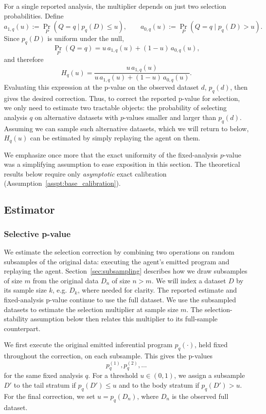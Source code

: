 \documentclass[10pt]{article}
\begin{document}
For a single reported analysis, the multiplier depends on just
two selection probabilities. Define
\[
a_{1,q}(u)
:=
\Pr_P\!\left(Q=q\mid p_q(D)\leq u\right),
\qquad
a_{0,q}(u)
:=
\Pr_P\!\left(Q=q\mid p_q(D)>u\right).
\]
Since $p_q(D)$ is uniform under the null,
\[
\Pr_P(Q=q)
=
u\,a_{1,q}(u)+(1-u)\,a_{0,q}(u),
\]
and therefore
\begin{equation} \label{eq:H_q_population_decomp}
H_q(u)
=
\frac{u\,a_{1,q}(u)}
     {u\,a_{1,q}(u)+(1-u)\,a_{0,q}(u)}.
\end{equation}
Evaluating this expression at the p-value on the observed dataset $d$, $p_q(d)$, then gives the desired correction. Thus, to correct the reported p-value for selection, we only need to estimate two tractable objects: the probability of selecting analysis $q$ on alternative datasets with $p$-values smaller and larger than $p_q(d)$. Assuming we can sample such alternative datasets, which we will return to below, $H_q(u)$ can be estimated by simply replaying the agent on them.

We emphasize once more that the exact uniformity of the fixed-analysis $p$-value was a simplifying assumption to ease exposition in this section. The theoretical results below require only \textit{asymptotic} exact calibration (Assumption~\ref{asspt:base_calibration}).

\subsection{Estimator}

\subsubsection{Selective p-value} \label{sec:selective_pvalue}

We estimate the selection correction by combining two operations on random subsamples of the original data: executing the agent's emitted program and replaying the agent. Section~\ref{sec:subsampling} describes how we draw subsamples of size $m$ from the original data $D_n$ of size $n>m$. We will index a dataset $D$ by its sample size $k$, e.g. $D_k$, where needed for clarity. The reported estimate and fixed-analysis p-value continue to use the full dataset. We use the subsampled datasets to estimate the selection multiplier at sample size $m$. The selection-stability assumption below then relates this multiplier to its full-sample counterpart.

We first execute the original emitted inferential program $p_q(\cdot)$, held fixed throughout the correction, on each subsample. This gives the p-values
\[
p_q^{(1)},p_q^{(2)},\ldots
\]
for the same fixed analysis $q$. For a threshold $u\in(0,1)$, we assign a subsample $D'$ to the tail stratum if $p_q(D')\leq u$ and to the body stratum if $p_q(D')>u$. For the final correction, we set $u=p_q(D_n)$, where $D_n$ is the observed full dataset.
\end{document}
